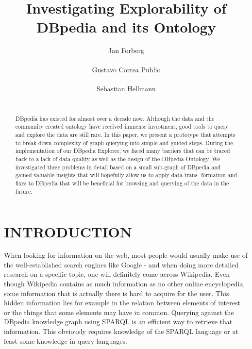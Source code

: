 \documentclass{sig-alternate}
\begin{document}
\title{Investigating Explorability of DBpedia and its Ontology}

\author{
\alignauthor
Jan Forberg\\
\\
\alignauthor
Gustavo Correa Publio\\
\\
\alignauthor
Sebastian Hellmann\\
\\
}
\maketitle

\begin{abstract}
DBpedia has existed for almost over a decade now. Although the data and the community created ontology have received immense investment, good tools to query and explore the data are still rare. In this paper, we present a prototype that attempts to break down complexity of graph querying into simple and guided steps. During the implementation of our DBpedia Explorer, we faced many barriers that can be traced back to a lack of data quality as well as the design of the DBpedia Ontology. We investigated these problems in detail based on a small sub-graph of DBpedia and gained valuable insights that will hopefully allow us to apply data trans- formation and ﬁxes to DBpedia that will be beneﬁcial for browsing and querying of the data in the future.
\end{abstract}




\section{INTRODUCTION}

When looking for information on the web, most people would usually make use of the well-established search engines like Google - and when doing more detailed research on a speciﬁc topic, one will deﬁnitely come across Wikipedia. Even though Wikipedia contains as much information as no other online encyclopedia, some information that is actually there is hard to acquire for the user. This hidden information lies for example in the relation between elements of interest or the things that some elements may have in common. Querying against the DBpedia knowledge graph using SPARQL is an eﬃcient way to retrieve that information. This obviously requires knowledge of the SPARQL language or at least some knowledge in query languages.
\end{document}
